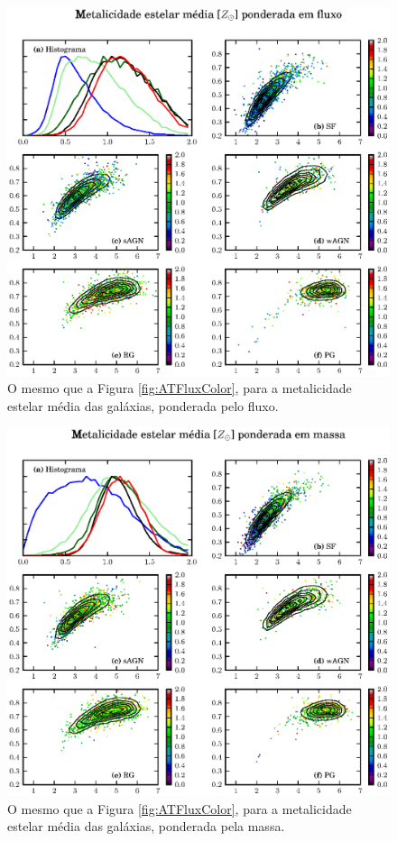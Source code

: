 \begin{figure}
	\includegraphics{figuras/uvcolor-color-am_flux-byclass.eps}
	\caption[Metalicidade estelar média ponderada em fluxo no diagrama cor--cor.]
	{O mesmo que a Figura \ref{fig:ATFluxColor}, para a metalicidade estelar média
	das galáxias, ponderada pelo fluxo.}
	\label{fig:AMFluxColor}
\end{figure}

\begin{figure}
	\includegraphics{figuras/uvcolor-color-am_mass-byclass.eps}
	\caption[Metalicidade estelar média ponderada em massa no diagrama cor--cor.]
	{O mesmo que a Figura \ref{fig:ATFluxColor}, para a metalicidade estelar média
	das galáxias, ponderada pela massa.}
	\label{fig:AMMassColor}
\end{figure}

